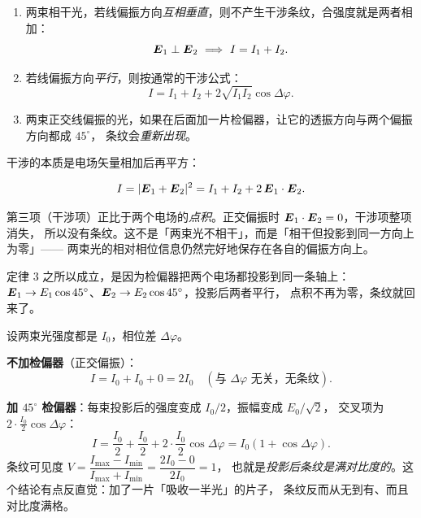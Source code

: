 \documentclass[11pt]{ctexart}
\let\subhdrtheme\subhdr
\renewcommand{\subhdr}[1]{\needspace{4\baselineskip}\subhdrtheme{#1}}
\let\hdrorig\hdr
\renewcommand{\hdr}[2]{\needspace{11\baselineskip}\hdrorig{#1}{#2}}
\begin{document}


\begin{enumerate}[label=\textbf{定律 \arabic*.},leftmargin=3.2em]
\item 两束相干光，若线偏振方向\emph{互相垂直}，则不产生干涉条纹，合强度就是两者相加：
\[
\vect E_1\perp\vect E_2\ \Longrightarrow\ I=I_1+I_2 .
\]
\item 若线偏振方向\emph{平行}，则按通常的干涉公式：
\[
I=I_1+I_2+2\sqrt{I_1I_2}\cos\Delta\varphi .
\]
\item 两束正交线偏振的光，如果在后面加一片检偏器，让它的透振方向与两个偏振方向都成 $45^\circ$，
条纹会\emph{重新出现}。
\end{enumerate}


干涉的本质是电场矢量相加后再平方：

\[
I=|\boldsymbol{E}_1+\boldsymbol{E}_2|^2=I_1+I_2+2\,\boldsymbol{E}_1\cdot\boldsymbol{E}_2 .
\]

第三项（干涉项）正比于两个电场的\emph{点积}。正交偏振时 $\boldsymbol{E}_1\cdot\boldsymbol{E}_2=0$，干涉项整项消失，
所以没有条纹。这不是「两束光不相干」，而是「相干但投影到同一方向上为零」——
两束光的相对相位信息仍然完好地保存在各自的偏振方向上。

定律 3 之所以成立，是因为检偏器把两个电场都投影到同一条轴上：
$\boldsymbol{E}_1\to E_1\cos45^\circ$、$\boldsymbol{E}_2\to E_2\cos45^\circ$，投影后两者平行，
点积不再为零，条纹就回来了。


设两束光强度都是 $I_0$，相位差 $\Delta\varphi$。

\textbf{不加检偏器}（正交偏振）：
\[
I=I_0+I_0+0=2I_0\quad(\text{与 }\Delta\varphi\text{ 无关，无条纹}).
\]

\textbf{加 $45^\circ$ 检偏器}：每束投影后的强度变成 $I_0/2$，振幅变成 $E_0/\sqrt2$，
交叉项为 $2\cdot\frac{I_0}{2}\cos\Delta\varphi$：
\[
I=\frac{I_0}{2}+\frac{I_0}{2}+2\cdot\frac{I_0}{2}\cos\Delta\varphi
=I_0(1+\cos\Delta\varphi).
\]
条纹可见度 $V=\dfrac{I_{\max}-I_{\min}}{I_{\max}+I_{\min}}=\dfrac{2I_0-0}{2I_0}=1$，
也就是\emph{投影后条纹是满对比度的}。这个结论有点反直觉：加了一片「吸收一半光」的片子，
条纹反而从无到有、而且对比度满格。

\end{document}
